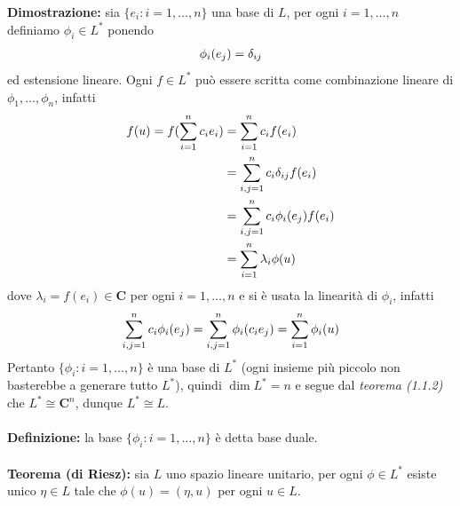\documentclass{article}
\begin{document}
\textbf{Dimostrazione:} sia $\{e_i : i = 1, \dots, n\}$ una base di $L$, per ogni $i = 1, \dots, n$ definiamo $\phi_i \in L^*$ ponendo
\begin{gather}
    \phi_i(e_j) = \delta_{ij} \notag
\end{gather}
ed estensione lineare. Ogni $f \in L^*$ può essere scritta come combinazione lineare di $\phi_1, \dots, \phi_n$, infatti
\begin{align}
    f(u) = f(\sum_{i = 1}^n c_ie_i) &= \sum_{i = 1}^n c_if(e_i) \notag \\
    &= \sum_{i, j = 1}^n c_i\delta_{ij}f(e_i) \notag \\
    &= \sum_{i, j = 1}^n c_i\phi_i(e_j)f(e_i) \notag \\
    &= \sum_{i = 1}^n \lambda_i\phi(u) \notag
\end{align}
dove $\lambda_i = f(e_i) \in \mathbf{C}$ per ogni $i = 1, \dots, n$ e si è usata la linearità di $\phi_i$, infatti
\begin{gather}
    \sum_{i, j = 1}^n c_i\phi_i(e_j) = \sum_{i, j = 1}^n \phi_i(c_ie_j) = \sum_{i = 1}^n \phi_i(u) \notag
\end{gather}
Pertanto $\{\phi_i : i = 1, \dots, n\}$ è una base di $L^*$ (ogni insieme più piccolo non basterebbe a generare tutto $L^*$), quindi $\dim L^* = n$ e segue dal \textit{teorema (1.1.2)} che $L^* \cong \mathbf{C}^n$, dunque $L^* \cong L$. \\ \\
\textbf{Definizione:} la base $\{\phi_i : i = 1, \dots, n\}$ è detta base duale. \\ \\
\textbf{Teorema (di Riesz):} sia $L$ uno spazio lineare unitario, per ogni $\phi \in L^*$ esiste unico $\eta \in L$ tale che $\phi(u) = (\eta, u)$ per ogni $u \in L$. \\
\end{document}
